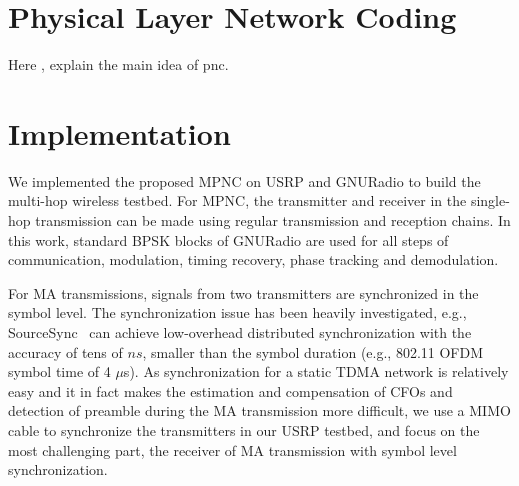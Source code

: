 \label{chapter:multi}

\section{Physical Layer Network Coding}
Here , explain the main idea of pnc.


\section{Implementation}
We implemented the proposed MPNC on USRP and GNURadio to build the multi-hop wireless testbed.
For MPNC, the transmitter and receiver in the single-hop transmission can be made using regular transmission and reception chains. In this work, standard BPSK blocks of GNURadio are used for all steps of communication, modulation, timing recovery, phase tracking and demodulation.

For  MA transmissions, signals from two transmitters are synchronized in the symbol level. The synchronization issue has been heavily investigated, e.g.,
SourceSync~\cite{sourcesync} can achieve low-overhead distributed synchronization with the accuracy of tens of $ns$, 
smaller than the symbol duration (e.g., 802.11 OFDM symbol time of 4 $\mu$s).
 As synchronization for a static TDMA network is relatively easy and it in fact makes the estimation and compensation of CFOs and detection of preamble during the MA transmission more difficult, we use a MIMO cable to synchronize the transmitters in our USRP testbed, and focus on the most challenging part,  the receiver of MA transmission with symbol level synchronization.

